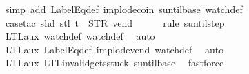 \begin{isabellebody}
{\ {\isacharparenleft}simp\ add{\isacharcolon}\ LabelEq{\isacharunderscore}def\ implode{\isacharunderscore}coin\ suntil{\isachardot}base\ watch{\isacharunderscore}def{\isacharparenright}\isanewline
\ \ \isamarkupfalse%
\ {\isacharparenleft}case{\isacharunderscore}tac\ {\isachardoublequoteopen}shd\ {\isacharparenleft}stl\ t{\isacharparenright}\ {\isacharequal}\ {\isacharparenleft}STR\ {\isacharprime}{\isacharprime}vend{\isacharprime}{\isacharprime}{\isacharcomma}\ {\isacharbrackleft}{\isacharbrackright}{\isacharparenright}{\isachardoublequoteclose}{\isacharparenright}\isanewline
\ \ \ \isamarkupfalse%
\ {\isacharparenleft}rule\ suntil{\isachardot}step{\isacharparenright}\isanewline
\ \ \isamarkupfalse%
\ LTL{\isacharunderscore}aux{}\ watch{\isacharunderscore}def\ watch{\isacharunderscore}def\ \isamarkupfalse%
\ auto{\isacharbrackleft}{}{\isacharbrackright}\isanewline
\ \ \isamarkupfalse%
\ LTL{\isacharunderscore}aux{}\ LabelEq{\isacharunderscore}def\ implode{\isacharunderscore}vend\ watch{\isacharunderscore}def\ \isamarkupfalse%
\ auto{\isacharbrackleft}{}{\isacharbrackright}\isanewline
\ \ \isamarkupfalse%
\ LTL{\isacharunderscore}aux{}\ LTL{\isacharunderscore}invalid{\isacharunderscore}gets{\isacharunderscore}stuck{\isacharunderscore}{}\ suntil{\isachardot}base\ \isamarkupfalse%
\ fastforce%
\endisatagproof
{\isafoldproof}%
%
\isadelimproof
%
\endisadelimproof
%
}%
%
\isadelimtheory
%
\endisadelimtheory
%
\isatagtheory
{}\isamarkupfalse%
%
\endisatagtheory
{\isafoldtheory}%
%
\isadelimtheory
%
\endisadelimtheory
%
\end{isabellebody}%
\endinput
